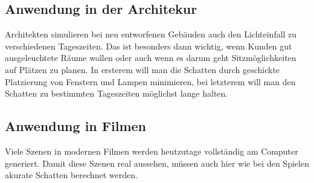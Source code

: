 \subsection{Anwendung in der Architekur}

Architekten simulieren bei neu entworfenen Gebäuden auch den Lichteinfall zu verschiedenen Tageszeiten.
Das ist besonders dann wichtig, wenn Kunden gut ausgeleuchtete Räume wollen oder auch wenn es darum geht
Sitzmöglichkeiten auf Plätzen zu planen. In ersterem will man die Schatten durch geschickte Platzierung
von Fenstern und Lampen minimieren, bei letzterem will man den Schatten zu bestimmten Tageszeiten
möglichst lange halten.

\subsection{Anwendung in Filmen}

Viele Szenen in modernen Filmen werden heutzutage vollständig am Computer generiert. Damit diese Szenen
real aussehen, müssen auch hier wie bei den Spielen akurate Schatten berechnet werden.
